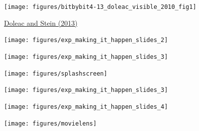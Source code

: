 \documentclass[aspectratio=169]{beamer}
\begin{document}
\begin{frame}

\begin{center}
\texttt{[image: figures/bitbybit4-13\_doleac\_visible\_2010\_fig1]}
\end{center}

\vfill
\href{https://doi.org/10.1111/ecoj.12082}{Doleac and Stein (2013)}

\end{frame}
\begin{frame}

\begin{center}
\texttt{[image: figures/exp\_making\_it\_happen\_slides\_2]}
\end{center}

\end{frame}
\begin{frame}

\begin{center}
\texttt{[image: figures/exp\_making\_it\_happen\_slides\_3]}
\end{center}

\end{frame}
\begin{frame}

\begin{center}
\texttt{[image: figures/splashscreen]}
\end{center}

\end{frame}
\begin{frame}

\begin{center}
\texttt{[image: figures/exp\_making\_it\_happen\_slides\_3]}
\end{center}

\end{frame}
\begin{frame}

\begin{center}
\texttt{[image: figures/exp\_making\_it\_happen\_slides\_4]}
\end{center}

\end{frame}
\begin{frame}

\begin{center}
\texttt{[image: figures/movielens]}
\end{center}

\end{frame}
\end{document}
